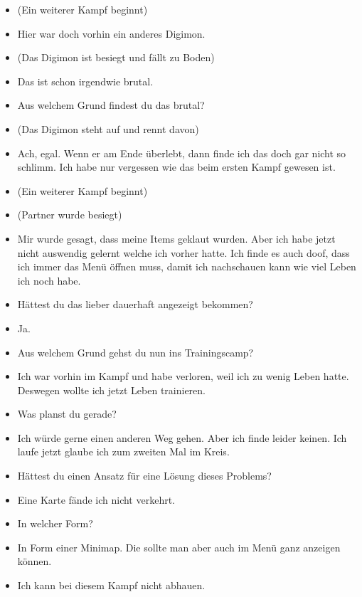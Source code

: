 {\begin{itemize}[]
    \item {} (Ein weiterer Kampf beginnt)
    \item {} Hier war doch vorhin ein anderes Digimon.
    \item {} (Das Digimon ist besiegt und fällt zu Boden)
    \item {} Das ist schon irgendwie brutal.
    \item {} Aus welchem Grund findest du das brutal?
    \item {} (Das Digimon steht auf und rennt davon)
    \item {} Ach, egal. Wenn er am Ende überlebt, dann finde ich das doch gar nicht so schlimm. Ich habe nur vergessen wie das beim ersten Kampf gewesen ist. 
    \item {} (Ein weiterer Kampf beginnt)
    \item {} (Partner wurde besiegt)
    \item {} Mir wurde gesagt, dass meine Items geklaut wurden. Aber ich habe jetzt nicht auswendig gelernt welche ich vorher hatte. Ich finde es auch doof, dass ich immer das Menü öffnen muss, damit ich nachschauen kann wie viel Leben ich noch habe. 
    \item {} Hättest du das lieber dauerhaft angezeigt bekommen?
    \item {} Ja. 
    \item {} Aus welchem Grund gehst du nun ins Trainingscamp?
    \item {} Ich war vorhin im Kampf und habe verloren, weil ich zu wenig Leben hatte. Deswegen wollte ich jetzt Leben trainieren.
    \item {} Was planst du gerade?
    \item {} Ich würde gerne einen anderen Weg gehen. Aber ich finde leider keinen. Ich laufe jetzt glaube ich zum zweiten Mal im Kreis.
    \item {} Hättest du einen Ansatz für eine Lösung dieses Problems?
    \item {} Eine Karte fände ich nicht verkehrt.
    \item {} In welcher Form? 
    \item {} In Form einer Minimap. Die sollte man aber auch im Menü ganz anzeigen können.
    \item {} Ich kann bei diesem Kampf nicht abhauen.

\end{itemize}}
